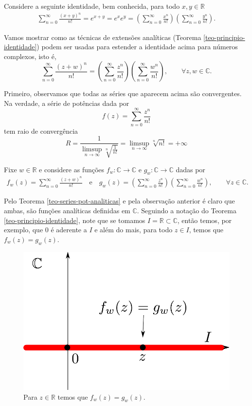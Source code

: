 \begin{exemplo}
Considere a seguinte identidade, bem conhecida, para todo $x,y\in\mathbb{R}$
\begin{align}\label{eq-aux1-form-prod-exp-ext-analitica}
\sum_{n=0}^{\infty} \frac{(x+y)^n }{n!}
=
e^{x+y}
=
e^xe^y
= 
\left( \sum_{n=0}^{\infty} \frac{x^n}{n!} \right)
\left( \sum_{n=0}^{\infty} \frac{y^n}{n!} \right).
\end{align}

Vamos mostrar como as técnicas de extensões analíticas 
(Teorema \ref{teo-principio-identidade})
podem ser usadas para estender a identidade acima para números complexos, isto é,
\[
\sum_{n=0}^{\infty} \frac{(z+w)^n }{n!}
= 
\left( \sum_{n=0}^{\infty} \frac{z^n}{n!} \right)
\left( \sum_{n=0}^{\infty} \frac{w^n}{n!} \right),
\qquad \forall z,w\in\mathbb{C}.
\]

Primeiro, observamos que todas as séries que aparecem acima são convergentes. 
Na verdade, a série de potências dada por
\[
f(z) = \sum_{n=0}^{\infty} \frac{z^n}{n!}
\]
tem raio de convergência
\[
R 
= 
\frac{1}{\displaystyle  \limsup_{n\to\infty} \sqrt[n]{ \frac{1}{n!} } }
=
\limsup_{n\to\infty} \sqrt[n]{ n! }
=+\infty
\]


Fixe $w\in \mathbb{R}$ e considere as funções 
$f_{w}:\mathbb{C}\to\mathbb{C}$ e $g_{w}:\mathbb{C}\to\mathbb{C}$ 
dadas por 
\begin{align*}
f_{w}(z) = \sum_{n=0}^{\infty} \frac{(z+w)^n }{n!}
\quad\text{e}\quad
g_{w}(z) = \left( \sum_{n=0}^{\infty} \frac{z^n}{n!} \right)
\left( \sum_{n=0}^{\infty} \frac{w^n}{n!} \right),
\qquad \forall z\in\mathbb{C}.
\end{align*}

Pelo Teorema \ref{teo-series-pot-analiticas} e pela observação anterior 
é claro que ambas, são funções analíticas
definidas em $\mathbb{C}$. 
Seguindo a notação do Teorema \ref{teo-principio-identidade},
note que se tomamos $I=\mathbb{R}\subset \mathbb{C}$, 
então temos, por exemplo, que $0$ é aderente a $I$ 
e além do mais, para todo $z\in I$, temos que
$f_{w}(z)=g_{w}(z)$. 


\begin{figure}[H]
\centering
\includegraphics[width=0.4\linewidth]{Figuras/zeros-isolados7}
\caption{Para $z\in\mathbb{R}$ temos que $f_{w}(z)=g_{w}(z)$.}
\label{fig:zeros-isolados7}
\end{figure}




\end{exemplo}
